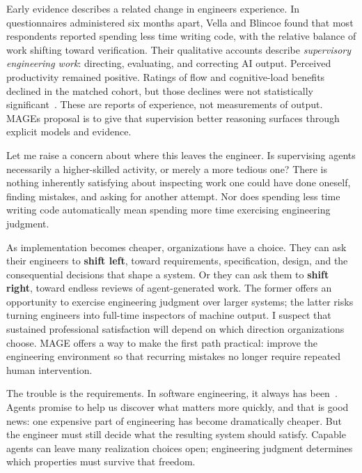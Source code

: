 Early evidence describes a related change in engineers\textquotesingle{} experience. In questionnaires administered six months apart, Vella and Blincoe found that most respondents reported spending less time writing code, with the relative balance of work shifting toward verification. Their qualitative accounts describe \emph{supervisory engineering work}: directing, evaluating, and correcting AI output. Perceived productivity remained positive. Ratings of flow and cognitive-load benefits declined in the matched cohort, but those declines were not statistically significant~\citep{vella2026impact}. These are reports of experience, not measurements of output. MAGE\textquotesingle s proposal is to give that supervision better reasoning surfaces through explicit models and evidence.

Let me raise a concern about where this leaves the engineer. Is supervising agents necessarily a higher-skilled activity, or merely a more tedious one? There is nothing inherently satisfying about inspecting work one could have done oneself, finding mistakes, and asking for another attempt. Nor does spending less time writing code automatically mean spending more time exercising engineering judgment.

As implementation becomes cheaper, organizations have a choice. They can ask their engineers to \textbf{shift left}, toward requirements, specification, design, and the consequential decisions that shape a system. Or they can ask them to \textbf{shift right}, toward endless reviews of agent-generated work. The former offers an opportunity to exercise engineering judgment over larger systems; the latter risks turning engineers into full-time inspectors of machine output. I suspect that sustained professional satisfaction will depend on which direction organizations choose. MAGE offers a way to make the first path practical: improve the engineering environment so that recurring mistakes no longer require repeated human intervention.


The trouble is the requirements. In software engineering, it always has been~\citep{brooks1987}. Agents promise to help us discover what matters more quickly, and that is good news: one expensive part of engineering has become dramatically cheaper. But the engineer must still decide what the resulting system should satisfy. Capable agents can leave many realization choices open; engineering judgment determines which properties must survive that freedom.

